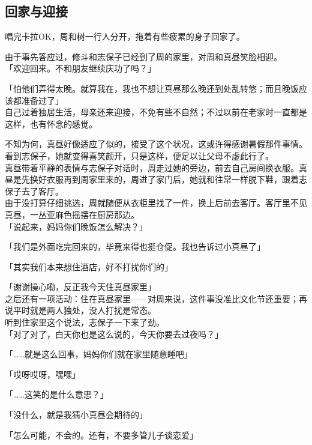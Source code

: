 \subsection{回家与迎接}

唱完卡拉OK，周和树一行人分开，拖着有些疲累的身子回家了。

由于事先答应过，修斗和志保子已经到了周的家里，对周和真昼笑脸相迎。\\

「欢迎回来。不和朋友继续庆功了吗？」

「怕他们弄得太晚。就算我在，我也不想让真昼那么晚还到处乱转悠；而且晚饭应该都准备过了」\\

自己过着独居生活，母亲还来迎接，不免有些不自然；不过以前在老家时一直都是这样，也有怀念的感觉。

不知为何，真昼好像适应了似的，接受了这个状况，这或许得感谢暑假那件事情。看到志保子，她就变得喜笑颜开，只是这样，便足以让父母不虚此行了。\\

真昼带着平静的表情与志保子对话时，周走过她的旁边，前去自己房间换衣服。真昼是先换好衣服再到周家里来的，周进了家门后，她就和往常一样脱下鞋，跟着志保子去了客厅。\\

由于没打算仔细挑选，周就随便从衣柜里找了一件，换上后前去客厅。客厅里不见真昼，一丛亚麻色摇摆在厨房那边。\\

「说起来，妈妈你们晚饭怎么解决？」

「我们是外面吃完回来的，毕竟来得也挺仓促。我也告诉过小真昼了」

「其实我们本来想住酒店，好不打扰你们的」

「谢谢操心嘞，反正我今天住真昼家里」\\

之后还有一项活动：住在真昼家里——对周来说，这件事没准比文化节还重要；再说平时就是两人独处，没人打扰是常态。\\

听到住家里这个说法，志保子一下来了劲。\\

「对了对了，白天你也是这么说的，今天你要去过夜吗？」

「……就是这么回事，妈妈你们就在家里随意睡吧」

「哎呀哎呀，嘿嘿」

「……这笑的是什么意思？」

「没什么，就是我猜小真昼会期待的」

「怎么可能，不会的。还有，不要多管儿子谈恋爱」\\

